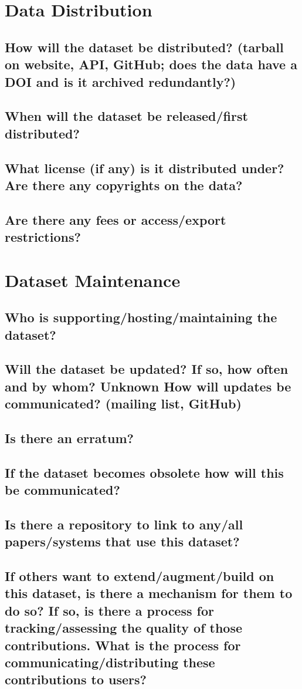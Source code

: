 
\section*{Data Distribution}
\subsection*{How will the dataset be distributed? (\eg tarball on website, API, GitHub; does the data have a DOI and is it archived redundantly?)}
\noindent
\subsection*{When will the dataset be released/first distributed?}
\noindent
\subsection*{What license (if any) is it distributed under? Are there any copyrights on the data?}
\noindent
\subsection*{Are there any fees or access/export restrictions?}
\noindent


\section*{Dataset Maintenance}
\subsection*{Who is supporting/hosting/maintaining the dataset?}
\noindent
\subsection*{Will the dataset be updated? If so, how often and by whom? Unknown
How will updates be communicated? (\eg mailing list, GitHub)}
\noindent
\subsection*{Is there an erratum?}
\noindent
\subsection*{If the dataset becomes obsolete how will this be communicated?}
\noindent
\subsection*{Is there a repository to link to any/all papers/systems that use this dataset?}
\noindent
\subsection*{If others want to extend/augment/build on this dataset, is there a mechanism for them to do so? If so, is there a process for tracking/assessing the quality of those contributions. What is the process for communicating/distributing these contributions to users?}
\noindent
